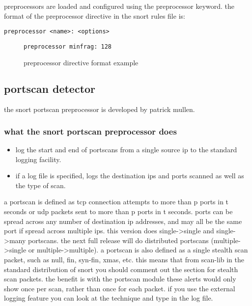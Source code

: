 \documentclass[english]{report}
\begin{document}
preprocessors are loaded and configured using the preprocessor keyword.
the format of the preprocessor directive in the snort rules file is:

\begin{verbatim}
preprocessor <name>: <options>
\end{verbatim}

\begin{figure}[!hbpt]
\begin{verbatim}
preprocessor minfrag: 128
\end{verbatim}

\caption{\label{preprocessor example}preprocessor directive format example}
\end{figure}

\subsection{portscan detector}

the snort portscan preprocessor is developed by patrick mullen.


\subsubsection{what the snort portscan preprocessor does}

\begin{itemize}
\item log the start and end of portscans from a single source ip to the
standard logging facility.
\item if a log file is specified, logs the destination ips and ports scanned
as well as the type of scan.
\end{itemize}
a portscan is defined as tcp connection attempts to more than p ports
in t seconds or udp packets sent to more than p ports in t seconds.
ports can be spread across any number of destination ip addresses,
and may all be the same port if spread across multiple ips. this version
does single->single and single->many portscans. the next full release
will do distributed portscans (multiple->single or multiple->multiple).
a portscan is also defined as a single stealth scan
packet, such as null, fin, syn-fin, xmas, etc. this means that from
scan-lib in the standard distribution of snort you should comment
out the section for stealth scan packets. the benefit is with the
portscan module these alerts would only show once per scan, rather
than once for each packet. if you use the external logging feature
you can look at the technique and type in the log file.
\end{document}

